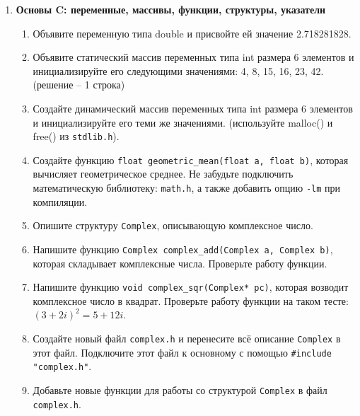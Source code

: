 \documentclass{article}
\begin{document}
\begin{enumerate}
\item \textbf{Основы C: переменные, массивы, функции, структуры, указатели}
\begin{enumerate}
\item Объявите переменную типа double и присвойте ей значение 2.718281828.
\item Объявите статический массив переменных типа int размера 6 элементов и инициализируйте его следующими значениями: 4, 8, 15, 16, 23, 42. (решение -- 1 строка)
\item Создайте динамический массив переменных типа int размера 6 элементов и инициализируйте его теми же значениями. (используйте malloc() и free() из \texttt{stdlib.h}).
\item Создайте функцию \texttt{float geometric\_mean(float a, float b)}, которая вычисляет геометрическое среднее. Не забудьте подключить математическую библиотеку: \texttt{math.h}, а также добавить опцию \texttt{-lm} при компиляции.
\item Опишите структуру \texttt{Complex}, описывающую комплексное число.
\item Напишите функцию \texttt{Complex complex\_add(Complex a, Complex b)}, которая складывает комплексные числа. Проверьте работу функции.
\item Напишите функцию \texttt{void complex\_sqr(Complex* pc)}, которая возводит комплексное число в квадрат. Проверьте работу функции на таком тесте: $(3 + 2i)^2 = 5 + 12i$.
\item Создайте новый файл \texttt{complex.h} и перенесите всё описание \texttt{Complex} в этот файл. Подключите этот файл к основному с помощью \texttt{\#include "complex.h"}.
\item Добавьте новые функции для работы со структурой \texttt{Complex} в файл \texttt{complex.h}.
\end{enumerate}

\end{enumerate}
\end{document}

